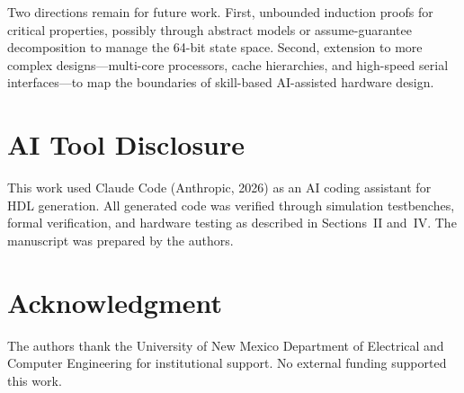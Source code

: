 \documentclass[journal]{IEEEtran}
\begin{document}
Two directions remain for future work. First, unbounded induction proofs for critical properties, possibly through abstract models or assume-guarantee decomposition to manage the 64-bit state space. Second, extension to more complex designs---multi-core processors, cache hierarchies, and high-speed serial interfaces---to map the boundaries of skill-based AI-assisted hardware design.

\section*{AI Tool Disclosure}
This work used Claude Code (Anthropic, 2026) as an AI coding assistant for HDL generation. All generated code was verified through simulation testbenches, formal verification, and hardware testing as described in Sections~II and~IV. The manuscript was prepared by the authors.

\section*{Acknowledgment}
The authors thank the University of New Mexico Department of Electrical and Computer Engineering for institutional support. No external funding supported this work.

\clearpage


\end{document}

